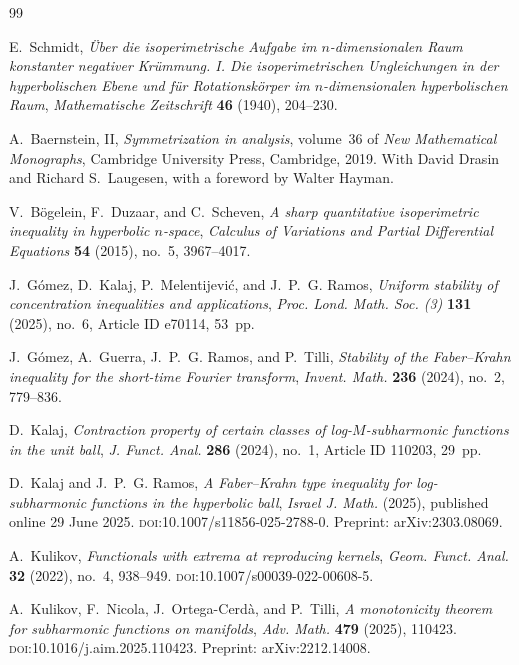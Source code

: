 \begin{thebibliography}{99}

E.~Schmidt, \emph{{\"U}ber die isoperimetrische {A}ufgabe im $n$-dimensionalen {R}aum konstanter negativer Kr{\"u}mmung. I. Die isoperimetrischen {U}ngleichungen in der hyperbolischen {E}bene und f\"ur {R}otationsk{\"o}rper im $n$-dimensionalen hyperbolischen {R}aum}, \emph{Mathematische Zeitschrift} \textbf{46} (1940), 204--230.

A.~Baernstein, II, \emph{Symmetrization in analysis}, volume~36 of \emph{New Mathematical Monographs}, Cambridge University Press, Cambridge, 2019. With David Drasin and Richard S.~Laugesen, with a foreword by Walter Hayman.

V.~B\"ogelein, F.~Duzaar, and C.~Scheven, \emph{A sharp quantitative isoperimetric inequality in hyperbolic $n$-space}, \emph{Calculus of Variations and Partial Differential Equations} \textbf{54} (2015), no.~5, 3967--4017.

J.~G{\'o}mez, D.~Kalaj, P.~Melentijevi{\'c}, and J.~P.~G. Ramos, \emph{Uniform stability of concentration inequalities and applications}, \emph{Proc. Lond. Math. Soc. (3)} \textbf{131} (2025), no.~6, Article ID e70114, 53~pp.

J.~G{\'o}mez, A.~Guerra, J.~P.~G. Ramos, and P.~Tilli, \emph{Stability of the Faber--Krahn inequality for the short-time Fourier transform}, \emph{Invent. Math.} \textbf{236} (2024), no.~2, 779--836.

D.~Kalaj, \emph{Contraction property of certain classes of log-$M$-subharmonic functions in the unit ball}, \emph{J. Funct. Anal.} \textbf{286} (2024), no.~1, Article ID 110203, 29~pp.

D.~Kalaj and J.~P.~G. Ramos, \emph{A Faber--Krahn type inequality for log-subharmonic functions in the hyperbolic ball}, \emph{Israel J. Math.} (2025), published online 29 June 2025. \textsc{doi}:10.1007/s11856-025-2788-0. Preprint: arXiv:2303.08069.

A.~Kulikov, \emph{Functionals with extrema at reproducing kernels}, \emph{Geom. Funct. Anal.} \textbf{32} (2022), no.~4, 938--949. \textsc{doi}:10.1007/s00039-022-00608-5.

A.~Kulikov, F.~Nicola, J.~Ortega-Cerd\`a, and P.~Tilli, \emph{A monotonicity theorem for subharmonic functions on manifolds}, \emph{Adv. Math.} \textbf{479} (2025), 110423. \textsc{doi}:10.1016/j.aim.2025.110423. Preprint: arXiv:2212.14008.


\end{thebibliography}
